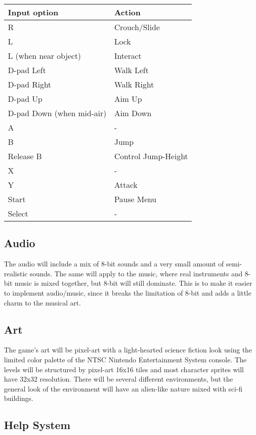 \documentclass[12pt]{article}
\begin{document}
\begin{center}
\begin{tabular}{ | l | l | }
 \hline
 \textbf{Input option} & \textbf{Action} \\
 \hline
 R & Crouch/Slide \\  
 \hline 
 L & Lock \\
 \hline
 L (when near object) & Interact \\
 \hline
 D-pad Left & Walk Left \\
 \hline
 D-pad Right & Walk Right \\
 \hline
 D-pad Up & Aim Up \\
 \hline
 D-pad Down (when mid-air) & Aim Down \\
 \hline
 A & - \\
 \hline
 B & Jump \\
 \hline
 Release B & Control Jump-Height\\
 \hline
 X & - \\
 \hline
 Y  &  Attack \\
 \hline
 Start & Pause Menu \\
 \hline
 Select & - \\
 \hline
\end{tabular}
\end{center}

\subsection{Audio}

The audio will include a mix of 8-bit sounds and a very small amount of semi-realistic sounds. The same will apply to the music, where real instruments and 8-bit music is mixed together, but 8-bit will still dominate. This is to make it easier to implement audio/music, since it breaks the limitation of 8-bit and adds a little charm to the musical art. 

\subsection{Art}

The game's art will be pixel-art with a light-hearted science fiction look using the limited color palette of the NTSC Nintendo Entertainment System console. The levels will be structured by pixel-art 16x16 tiles and most character sprites will have 32x32 resolution. There will be several different environments, but the general look of the environment will have an alien-like nature mixed with sci-fi buildings. 

\subsection{Help System}
\end{document}
